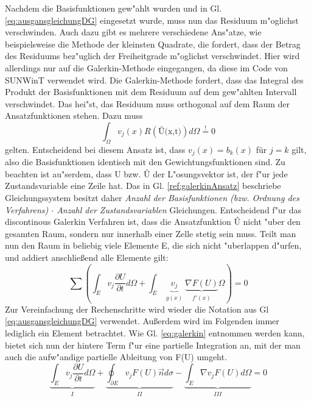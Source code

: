 Nachdem die Basisfunktionen gew"ahlt wurden und in Gl. \ref{eq:ausgansgleichungDG} eingesetzt wurde, muss nun das Residuum m"oglichst verschwinden. Auch dazu gibt es mehrere verschiedene Ans"atze, wie beispielsweise die Methode der kleinsten Quadrate, die fordert, dass der Betrag des Residuums bez"uglich der Freiheitgrade m"oglichst verschwindet. Hier wird allerdings nur auf die Galerkin-Methode eingegangen, da diese im Code von SUNWinT verwendet wird.
Die Galerkin-Methode fordert, dass das Integral des Produkt der Basisfunktionen mit dem Residuum auf dem gew"ahlten Intervall verschwindet. Das hei"st, das Residuum muss orthogonal auf dem Raum der Ansatzfunktionen stehen. Dazu muss
\begin{equation}\label{eq:galerkinAnsatz}
	\int_{\Omega} v_{j}(x) R(\text{\^{U}(x,t)}) d\Omega  \overset{!}{=} 0
\end{equation}
gelten.
Entscheidend bei diesem Ansatz ist, dass $v_{j}(x)=b_{k}(x)$ für $j=k$ gilt, also die Basisfunktionen identisch mit den Gewichtungsfunktionen sind. Zu beachten ist au"serdem, dass U bzw. \^{U} der L"osungsvektor ist, der f"ur jede Zustandsvariable eine Zeile hat. Das in Gl. \ref{ref:galerkinAnsatz} beschriebe Gleichungssystem besitzt daher \textit{Anzahl der Basisfunktionen (bzw. Ordnung des Verfahrens) $\cdot$ Anzahl der Zustandsvariablen} Gleichungen.
Entscheidend f"ur das discontinous Galerkin Verfahren ist, dass die Ansatzfunktion \^{U} nicht "uber den gesamten Raum, sondern nur innerhalb einer Zelle stetig sein muss. Teilt man nun den Raum in beliebig viele Elemente E, die sich nicht "uberlappen d"urfen, und addiert anschließend alle Elemente gilt:
\begin{equation}\label{eq:galerkin}
	\sum (\int_{E}v_{j}\frac{\partial U}{\partial t}d\Omega+ \int_{E} \underbrace{v_{j}}_{\substack{g(x)}}\underbrace{\nabla F(U)}_{\substack{f'(x)}}{\Omega}) = 0
\end{equation}
Zur Vereinfachung der Rechenschritte wird wieder die Notation aus Gl \ref{eq:ausgansgleichungDG} verwendet. Außerdem wird im Folgenden immer lediglich ein Element betrachtet. Wie Gl. \ref{eq:galerkin} entnommen werden kann, bietet sich nun der hintere Term f"ur eine partielle Integration an, mit der man auch die aufw"andige partielle Ableitung von F({U}) umgeht.
\begin{equation}\label{eq:basisDG}
	\underbrace{\int_{E}v_{j}\frac{\partial U}{\partial t}d\Omega}_{\substack{I}} +	
	\underbrace{\oint_{\partial E}v_{j}F(U)\vec{n}d\sigma}_{\substack{II}}-
	\underbrace{\int_{E}\nabla v_{j}F(U)d\Omega}_{\substack{III}} = 0
\end{equation}

